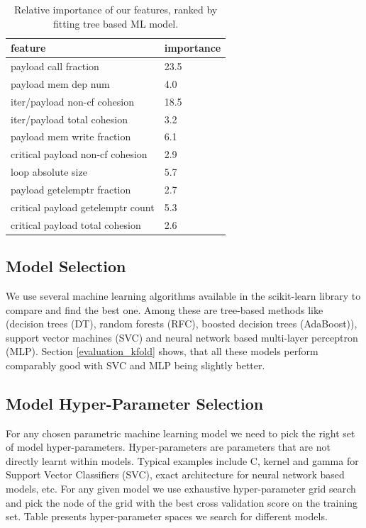 \documentclass[sigconf,10pt,review,anonymous]{acmart}
\begin{document}
\begin{table}[h!]
    \centering
    \begin{tabular}[c]{|p{5.5cm}|p{1.5cm}|}
        \hline
        feature & importance\\
        \hline
        payload call fraction & 23.5\\
        \hline
        payload mem dep num & 4.0\\
        \hline
        iter/payload non-cf cohesion & 18.5\\
        \hline
        iter/payload total cohesion & 3.2\\
        \hline
        payload mem write fraction & 6.1\\
        \hline
        critical payload non-cf cohesion & 2.9\\
        \hline
        loop absolute size & 5.7\\
        \hline
        payload getelemptr fraction & 2.7\\
        \hline
        critical payload getelemptr count & 5.3\\ 
        \hline
        critical payload total cohesion & 2.6\\
        \hline
    \end{tabular}
    \caption{Relative importance of our features, ranked by fitting tree based ML model.}
    \label{tab:best_features}
\end{table}

\subsection{Model Selection}
\label{model_selection}
\quad We use several machine learning algorithms available in the scikit-learn library to compare and find the best one. Among these are tree-based methods like (decision trees (DT), random forests (RFC), boosted decision trees (AdaBoost)), support vector machines (SVC) and neural network based multi-layer perceptron (MLP). Section \ref{evaluation_kfold} shows, that all these models perform comparably good with SVC and MLP being slightly better. 

\subsection{Model Hyper-Parameter Selection}
\label{model_hyper_parameter_selection}
\quad For any chosen parametric machine learning model we need to pick the right set of model hyper-parameters. Hyper-parameters are parameters that are not directly learnt within models. Typical examples include C, kernel and gamma for Support Vector Classifiers (SVC), exact architecture for neural network based models, etc. For any given model we use exhaustive hyper-parameter grid search and pick the node of the grid with the best cross validation score on the training set. Table presents hyper-parameter spaces we search for different models.
\end{document}
